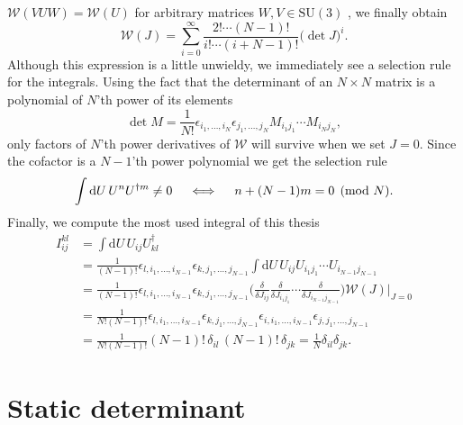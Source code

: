 $\mathcal{W}(VUW) = \mathcal{W}(U)$ for arbitrary matrices $W, V \in
\text{SU}(3)$ \citep{Creutz:1977yy}, we finally obtain
%
\begin{equation}
  \mathcal{W}(J) = \sum_{i=0}^{\infty} \frac{2! \cdots (N-1)!}{i! \cdots
    (i+N-1)!} \big(\det J\big)^i.
\end{equation}
%
Although this expression is a little unwieldy, we immediately see a selection
rule for the integrals. Using the fact that the determinant of an $N \times N$ matrix is a
polynomial of $N$'th power of its elements
%
\begin{equation}
  \det M = \frac{1}{N!} \epsilon_{i_1,\dots,i_N} \epsilon_{j_1, \dots, j_N}
  M_{i_1j_1} \cdots M_{i_Nj_N},
\end{equation}
%
only factors of $N$'th power derivatives of $\mathcal{W}$ will
survive when we set $J=0$. Since the cofactor is a $N-1$'th power polynomial we
get the selection rule
%
\begin{equation} \label{eq:integral-selection-rule}
  \int \mathrm{d} U \, U^n U^{\dagger m} \neq 0  \hskip1em\iff\hskip1em n + (N-1)m = 0 \pmod N.
\end{equation}
%
Finally, we compute the most used integral of this thesis
%
\begin{align}
  I_{ij}^{kl} &= \int \mathrm{d} U \, U_{ij} U^{\dagger}_{kl} \nonumber\\
  &= \frac{1}{(N-1)!} \epsilon_{l,i_1,\dots,i_{N-1}} \epsilon_{k, j_1, \dots, j_{N-1}}
    \int \mathrm{d} U \, U_{ij} U_{i_1j_1} \cdots U_{i_{N-1}j_{N-1}} \nonumber\\
  &= \frac{1}{(N-1)!} \epsilon_{l,i_1,\dots,i_{N-1}} \epsilon_{k, j_1, \dots, j_{N-1}}
    \bigg( \frac{\delta}{\delta J_{ij}} \frac{\delta}{\delta J_{i_1j_1}} \cdots
    \frac{\delta}{\delta J_{i_{N-1}j_{N-1}}} \bigg) \mathcal{W}(J) \bigg|_{J=0}
    \nonumber \\
  &= \frac{1}{N!(N-1)!} \epsilon_{l,i_1,\dots,i_{N-1}} \epsilon_{k, j_1, \dots, j_{N-1}}
  \epsilon_{i,i_1,\dots,i_{N-1}} \epsilon_{j,j_1,\dots,j_{N-1}} \nonumber \\
  &= \frac{1}{N!(N-1)!} (N-1)!\,\delta_{il}\,(N-1)!\,\delta_{jk} = \frac{1}{N}
  \delta_{il} \delta_{jk} .
  \label{eq:uub-integral}
\end{align}

\section{Static determinant} \label{sec:evaluating-fermion-determinants}

